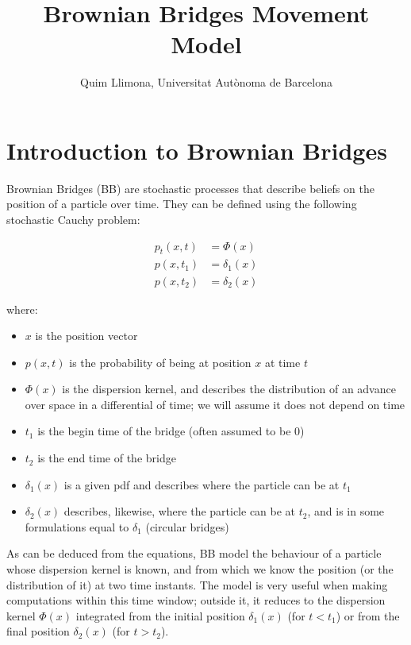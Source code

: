 \documentclass{article}
\title{Brownian Bridges Movement Model}
\author{Quim Llimona, Universitat Autònoma de Barcelona}
\date{}
\begin{document}
\maketitle

\tableofcontents
\clearpage

\section{Introduction to Brownian Bridges}

Brownian Bridges (BB) are stochastic processes that describe beliefs on the position of a particle over time. They can be defined using the following stochastic Cauchy problem:

\begin{align*}
    p_t(x,t) &= \Phi(x) \\        %
    p(x,t_1) &= \delta_1(x) \\
    p(x,t_2) &= \delta_2(x)
\end{align*}

where:

\begin{itemize}
    \item $x$ is the position vector
    \item $p(x,t)$ is the probability of being at position $x$ at time $t$
    \item $\Phi(x)$ is the dispersion kernel, and describes the distribution of an advance over space in a differential of time; we will assume it does not depend on time
    \item $t_1$ is the begin time of the bridge (often assumed to be 0)
    \item $t_2$ is the end time of the bridge
    \item $\delta_1(x)$ is a given pdf and describes where the particle can be at $t_1$
    \item $\delta_2(x)$ describes, likewise, where the particle can be at $t_2$, and is in some formulations equal to $\delta_1$ (circular bridges)
\end{itemize}

As can be deduced from the equations, BB model the behaviour of a particle whose dispersion kernel is known, and from which we know the position (or the distribution of it) at two time instants. The model is very useful when making computations within this time window; outside it, it reduces to the dispersion kernel $\Phi(x)$ integrated from the initial position $\delta_1(x)$ (for $t < t_1$) or from the final position $\delta_2(x)$ (for $t > t_2$).
\end{document}
